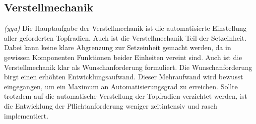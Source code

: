 \subsection{Verstellmechanik}
\label{verstellmechanik}
\textit{(ygu)} Die Hauptaufgabe der Verstellmechanik ist die automatisierte Einstellung aller geforderten Topfradien. Auch ist die Verstellmechanik Teil der Setzeinheit. Dabei kann keine klare Abgrenzung zur Setzeinheit gemacht werden, da in gewissen Komponenten Funktionen beider Einheiten vereint sind. Auch ist die Verstellmechanik klar als Wunschanforderung formuliert. Die Wunschanforderung birgt einen erhöhten Entwicklungsaufwand. Dieser Mehraufwand wird bewusst eingegangen, um ein Maximum an Automatisierungsgrad zu erreichen. Sollte trotzdem auf die automatische Verstellung der Topfradien verzichtet werden, ist die Entwicklung der Pflichtanforderung weniger zeitintensiv und rasch implementiert.
\newline

